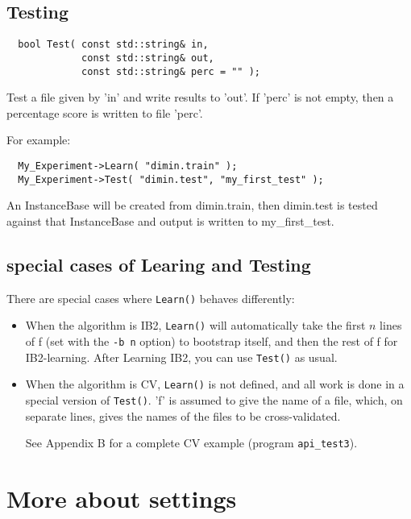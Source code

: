 \documentclass{report}
\begin{document}
\subsection{Testing}
\begin{footnotesize}
\begin{verbatim}
  bool Test( const std::string& in,
             const std::string& out,
             const std::string& perc = "" );
\end{verbatim}
\end{footnotesize}

Test a file given by 'in' and write results to 'out'. If 'perc' is not
empty, then a percentage score is written to file 'perc'.

For example:

\begin{footnotesize}
\begin{verbatim}
  My_Experiment->Learn( "dimin.train" );  
  My_Experiment->Test( "dimin.test", "my_first_test" );  
\end{verbatim}
\end{footnotesize}

An InstanceBase will be created from dimin.train, then dimin.test is
tested against that InstanceBase and output is written to
my\_first\_test.

\subsection{special cases of Learing and Testing}

There are special cases where {\tt Learn()} behaves differently:

\begin{itemize}
\item When the algorithm is IB2, {\tt Learn()} will automatically take
  the first $n$ lines of f (set with the {\tt -b n} option) to
  bootstrap itself, and then the rest of f for IB2-learning. After
  Learning IB2, you can use {\tt Test()} as usual.

\item When the algorithm is CV, {\tt Learn()} is not defined, and all
  work is done in a special version of {\tt Test()}. 'f' is assumed to
  give the name of a file, which, on separate lines, gives the names
  of the files to be cross-validated.

See Appendix B for a complete CV example (program {\tt api\_test3}).
\end{itemize}

\section{More about settings}
\end{document}
